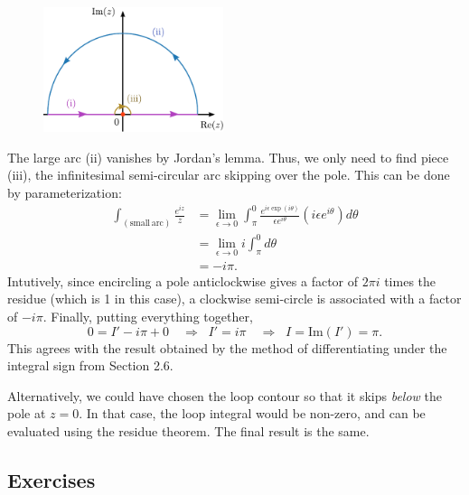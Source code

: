 \documentclass[10pt,a4paper]{article}
\begin{document}
\begin{figure}[ht]
  \centering\includegraphics[width=0.47\textwidth]{principal_value_integral}
\end{figure}

The large arc (ii) vanishes by Jordan's lemma. Thus, we only need to find
piece (iii), the infinitesimal semi-circular arc skipping over the
pole. This can be done by parameterization:
\begin{align}
  \int_{(\mathrm{small}\,\mathrm{arc})} \frac{e^{iz}}{z}
  &= \lim_{\epsilon \rightarrow 0} \int_{\pi}^{0} \frac{e^{i\epsilon \exp(i\theta)}}{\epsilon e^{i\theta}} \left(i\epsilon e^{i\theta}\right) d\theta \\
  &= \lim_{\epsilon \rightarrow 0} i \int_{\pi}^0 d\theta \\
  &= - i\pi.
\end{align}
Intutively, since encircling a pole anticlockwise gives a factor of
$2\pi i$ times the residue (which is 1 in this case), a clockwise
semi-circle is associated with a factor of $- i \pi$. Finally, putting
everything together,
\begin{equation}
0 = I' - i \pi + 0 \quad \Rightarrow \;\; I' = i \pi \quad\Rightarrow \;\; I = \mathrm{Im}(I') = \pi.
\end{equation}
This agrees with the result obtained by the method of differentiating
under the integral sign from Section 2.6.

Alternatively, we could have chosen the loop contour so that it skips
\emph{below} the pole at $z = 0$. In that case, the loop integral
would be non-zero, and can be evaluated using the residue theorem. The
final result is the same.

\subsection{Exercises}
\label{exercises}
\end{document}
